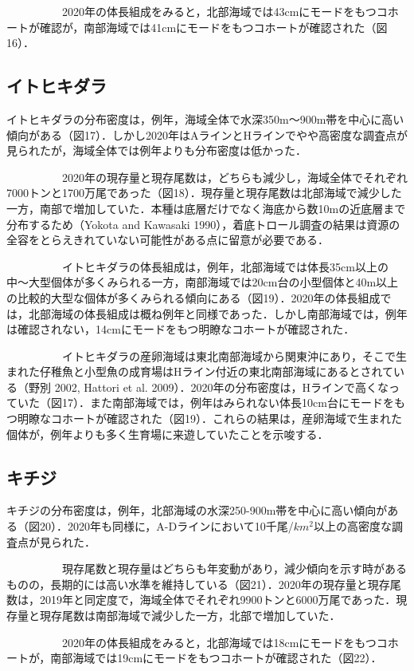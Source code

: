 \documentclass[11pt]{article} %
\begin{document}
\begin{linenumbers}
\ \ \ \ \ \ \ \ \ \ 
2020年の体長組成をみると，北部海域では43cmにモードをもつコホートが確認が，南部海域では41cmにモードをもつコホートが確認された（図16）．


\subsection{イトヒキダラ}
イトヒキダラの分布密度は，例年，海域全体で水深350m～900m帯を中心に高い傾向がある（図17）．しかし2020年はAラインとHラインでやや高密度な調査点が見られたが，海域全体では例年よりも分布密度は低かった．

\ \ \ \ \ \ \ \ \ \ 
2020年の現存量と現存尾数は，どちらも減少し，海域全体でそれぞれ7000トンと1700万尾であった（図18）．現存量と現存尾数は北部海域で減少した一方，南部で増加していた．本種は底層だけでなく海底から数10mの近底層まで分布するため（Yokota and Kawasaki 1990），着底トロール調査の結果は資源の全容をとらえきれていない可能性がある点に留意が必要である．

\ \ \ \ \ \ \ \ \ \ 
イトヒキダラの体長組成は，例年，北部海域では体長35cm以上の中〜大型個体が多くみられる一方，南部海域では20cm台の小型個体と40m以上の比較的大型な個体が多くみられる傾向にある（図19）．2020年の体長組成では，北部海域の体長組成は概ね例年と同様であった．しかし南部海域では，例年は確認されない，14cmにモードをもつ明瞭なコホートが確認された．

\ \ \ \ \ \ \ \ \ \ 
イトヒキダラの産卵海域は東北南部海域から関東沖にあり，そこで生まれた仔稚魚と小型魚の成育場はHライン付近の東北南部海域にあるとされている（野別 2002, Hattori et al. 2009）．2020年の分布密度は，Hラインで高くなっていた（図17）．また南部海域では，例年はみられない体長10cm台にモードをもつ明瞭なコホートが確認された（図19）．これらの結果は，産卵海域で生まれた個体が，例年よりも多く生育場に来遊していたことを示唆する．


\subsection{キチジ}
キチジの分布密度は，例年，北部海域の水深250-900m帯を中心に高い傾向がある（図20）．2020年も同様に，A-Dラインにおいて10千尾/$km^2$以上の高密度な調査点が見られた．

\ \ \ \ \ \ \ \ \ \ 
現存尾数と現存量はどちらも年変動があり，減少傾向を示す時があるものの，長期的には高い水準を維持している（図21）．2020年の現存量と現存尾数は，2019年と同定度で，海域全体でそれぞれ9900トンと6000万尾であった．現存量と現存尾数は南部海域で減少した一方，北部で増加していた．

\ \ \ \ \ \ \ \ \ \ 
2020年の体長組成をみると，北部海域では18cmにモードをもつコホートが，南部海域では19cmにモードをもつコホートが確認された（図22）．



\end{linenumbers}
\end{document}
